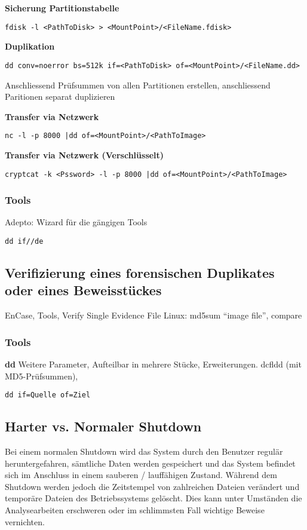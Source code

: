 \textbf{Sicherung Partitionstabelle}\\
\begin{verbatim}
fdisk -l <PathToDisk> > <MountPoint>/<FileName.fdisk>
\end{verbatim}

\textbf{Duplikation}
\begin{verbatim}
dd conv=noerror bs=512k if=<PathToDisk> of=<MountPoint>/<FileName.dd>
\end{verbatim}

Anschliessend Prüfsummen von allen Partitionen erstellen, anschliessend Paritionen separat duplizieren

\textbf{Transfer via Netzwerk}
\begin{verbatim}
nc -l -p 8000 |dd of=<MountPoint>/<PathToImage>
\end{verbatim}

\textbf{Transfer via Netzwerk (Verschlüsselt)}
\begin{verbatim}
cryptcat -k <Pssword> -l -p 8000 |dd of=<MountPoint>/<PathToImage>
\end{verbatim}

\subsubsection{Tools}
Adepto: Wizard für die gängigen Tools

\begin{verbatim}
dd if//de
\end{verbatim}

\subsection{Verifizierung eines forensischen Duplikates oder eines Beweisstückes}
EnCase, Tools, Verify Single Evidence File
Linux: md5sum "`image file"', compare

\subsubsection{Tools}
\textbf{dd}
Weitere Parameter, Aufteilbar in mehrere Stücke, Erweiterungen. dcfldd (mit MD5-Prüfsummen), 
\begin{verbatim}
dd if=Quelle of=Ziel
\end{verbatim}


\subsection{Harter vs. Normaler Shutdown}
Bei einem normalen Shutdown wird das System durch den Benutzer regulär heruntergefahren, sämtliche Daten werden gespeichert und das System befindet sich im Anschluss in einem sauberen / lauffähigen Zustand. Während dem Shutdown werden jedoch die Zeitstempel von zahlreichen Dateien verändert und temporäre Dateien des Betriebssystems gelöscht. Dies kann unter Umständen die Analysearbeiten erschweren oder im schlimmsten Fall wichtige Beweise vernichten. 

